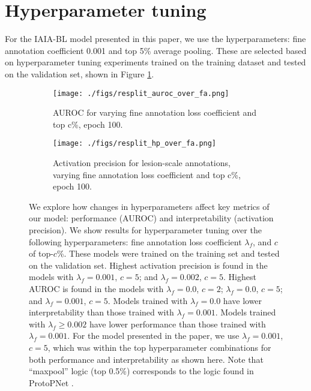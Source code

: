 \documentclass[11pt]{article}
\begin{document}
\section{Hyperparameter tuning} \label{app:hyperparams}
\FloatBarrier

For the IAIA-BL model presented in this paper, we use the hyperparameters: fine annotation coefficient 0.001 and top 5\% average pooling. These are selected based on hyperparameter tuning experiments trained on the training dataset and tested on the validation set, shown in Figure \ref{fig:hyperparameters}.
\begin{figure}[h]
    \centering
        \begin{subfigure}{0.4\textwidth}
        \texttt{[image: ./figs/resplit\_auroc\_over\_fa.png]}
        \caption{AUROC for varying fine annotation loss coefficient and top c\%, epoch 100.}
        \end{subfigure}
        \hfil
        \begin{subfigure}{0.4\textwidth}
        \texttt{[image: ./figs/resplit\_hp\_over\_fa.png]}
        \caption{Activation precision for lesion-scale annotations, varying fine annotation loss coefficient and top c\%, epoch 100.}
        \end{subfigure}
        
    \caption{We explore how changes in hyperparameters affect key metrics of our model: performance (AUROC) and interpretability (activation precision). We show results for hyperparameter tuning over the following hyperparameters: fine annotation loss coefficient $\lambda_f$, and $c$ of top-$c$\%. These models were trained on the training set and tested on the validation set. Highest activation precision is found in the models with $\lambda_f=0.001$, $c=5$; and $\lambda_f=0.002$, $c=5$. Highest AUROC is found in the models with $\lambda_f=0.0$, $c=2$; $\lambda_f=0.0$, $c=5$; and $\lambda_f=0.001$, $c=5$. Models trained with $\lambda_f=0.0$ have lower interpretability than those trained with $\lambda_f=0.001$. Models trained with $\lambda_f\ge 0.002$ have lower performance than those trained with $\lambda_f=0.001$. For the model presented in the paper, we use $\lambda_f=0.001$, $c=5$, which was within the top hyperparameter combinations for both performance and interpretability as shown here. Note that ``maxpool'' logic (top 0.5\%) corresponds to the logic found in ProtoPNet \cite{PPNet}.}
    \label{fig:hyperparameters}
\end{figure}
\FloatBarrier
\end{document}
